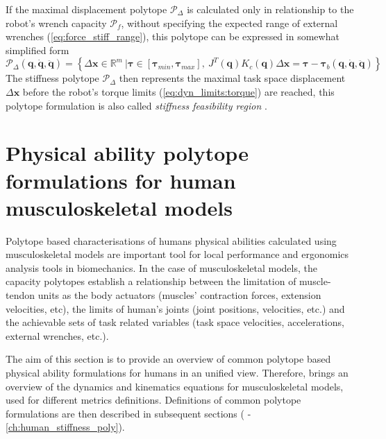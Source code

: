 If the maximal displacement polytope $\mathcal{P}_\Delta$ is calculated only in relationship to the robot's wrench capacity $\mathcal{P}_f$, without specifying the expected range of external wrenches (\ref{eq:force_stiff_range}), this polytope can be expressed in somewhat simplified form
\begin{equation}
    \mathcal{P}_\Delta(\bm{q},\dot{\bm{q}},\ddot{\bm{q}}) =\! \left\{ \Delta\bm{x} \in \mathbb{R}^m ~|\bm{\tau}\in\left[\bm{\tau}_{min}, \bm{\tau}_{max} \right]\!,\! ~ J^T(\bm{q})K_c(\bm{q})\Delta\bm{x}\!= \bm{\tau}\! -\! \bm{\tau}_b(\bm{q},\dot{\bm{q}},\ddot{\bm{q}}) \right\}
    \label{eq:pol_sfr_rob}
\end{equation}
The stiffness polytope $\mathcal{P}_\Delta$ then represents the maximal task space displacement $\Delta \bm{x}$ before the robot's torque limits (\ref{eq:dyn_limits:torque}) are reached, this polytope formulation is also called \textit{stiffness feasibility region} \cite{ajoudani2017choosing,ajoudani2015role}.

\section{Physical ability polytope formulations for human musculoskeletal models}
\label{ch:human_metrics}
Polytope based characterisations of humans physical abilities calculated using musculoskeletal models are important tool for local performance and ergonomics analysis tools in biomechanics. In the case of musculoskeletal models, the capacity polytopes establish a relationship between the limitation of muscle-tendon units as the body actuators (muscles' contraction forces,  extension velocities, etc), the limits of human's joints (joint positions, velocities, etc.) and the achievable sets of task related variables (task space velocities, accelerations, external wrenches, etc.).

The aim of this section is to provide an overview of common polytope based physical ability formulations for humans in an unified view. Therefore,  brings an overview of the dynamics and kinematics equations for musculoskeletal models, used for different metrics definitions. Definitions of common polytope formulations are then described in subsequent sections ( - \ref{ch:human_stiffness_poly}).

